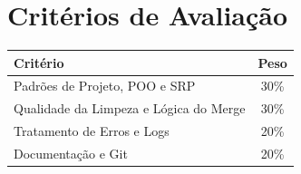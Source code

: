 \documentclass[12pt,a4paper]{article}
\begin{document}
	\section{Critérios de Avaliação}
	\begin{center}
		\begin{tabular}{lc}
			\toprule
			\textbf{Critério} & \textbf{Peso} \\
			\midrule
			Padrões de Projeto, POO e SRP & 30\% \\
			Qualidade da Limpeza e Lógica do Merge & 30\% \\
			Tratamento de Erros e Logs & 20\% \\
			Documentação e Git & 20\% \\
			\bottomrule
		\end{tabular}
	\end{center}
	
\end{document}

